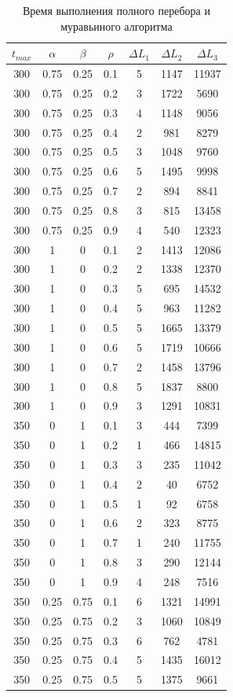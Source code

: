 \documentclass[a4paper,oneside,14pt]{extreport}
\begin{document}
\begin{table}[H]
\begin{center}
	\caption[]{\label{tbl:only} Время выполнения полного перебора и муравьиного алгоритма}
	\begin{tabular}{|c|c|c|c|c|c|c|}
		\hline
		$t_{max}$ & $\alpha$ & $\beta$ &$\rho$ & $\Delta L_{1}$ & $\Delta L_{2}$ & $\Delta L_{3}$\\
		\hline
		300 & 0.75 & 0.25 & 0.1 & 5 & 1147 & 11937 \\
		300 & 0.75 & 0.25 & 0.2 & 3 & 1722 & 5690 \\
		300 & 0.75 & 0.25 & 0.3 & 4 & 1148 & 9056 \\
		300 & 0.75 & 0.25 & 0.4 & 2 & 981 & 8279 \\
		300 & 0.75 & 0.25 & 0.5 & 3 & 1048 & 9760 \\
		300 & 0.75 & 0.25 & 0.6 & 5 & 1495 & 9998 \\
		300 & 0.75 & 0.25 & 0.7 & 2 & 894 & 8841 \\
		300 & 0.75 & 0.25 & 0.8 & 3 & 815 & 13458 \\
		300 & 0.75 & 0.25 & 0.9 & 4 & 540 & 12323 \\
		300 & 1 & 0 & 0.1 & 2 & 1413 & 12086 \\
		300 & 1 & 0 & 0.2 & 2 & 1338 & 12370 \\
		300 & 1 & 0 & 0.3 & 5 & 695 & 14532 \\
		300 & 1 & 0 & 0.4 & 5 & 963 & 11282 \\
		300 & 1 & 0 & 0.5 & 5 & 1665 & 13379 \\
		300 & 1 & 0 & 0.6 & 5 & 1719 & 10666 \\
		300 & 1 & 0 & 0.7 & 2 & 1458 & 13796 \\
		300 & 1 & 0 & 0.8 & 5 & 1837 & 8800 \\
		300 & 1 & 0 & 0.9 & 3 & 1291 & 10831 \\
		350 & 0 & 1 & 0.1 & 3 & 444 & 7399 \\
		350 & 0 & 1 & 0.2 & 1 & 466 & 14815 \\
		350 & 0 & 1 & 0.3 & 3 & 235 & 11042 \\
		350 & 0 & 1 & 0.4 & 2 & 40 & 6752 \\
		350 & 0 & 1 & 0.5 & 1 & 92 & 6758 \\
		350 & 0 & 1 & 0.6 & 2 & 323 & 8775 \\
		350 & 0 & 1 & 0.7 & 1 & 240 & 11755 \\
		350 & 0 & 1 & 0.8 & 3 & 290 & 12144 \\
		350 & 0 & 1 & 0.9 & 4 & 248 & 7516 \\
		350 & 0.25 & 0.75 & 0.1 & 6 & 1321 & 14991 \\
		350 & 0.25 & 0.75 & 0.2 & 3 & 1060 & 10849 \\
		350 & 0.25 & 0.75 & 0.3 & 6 & 762 & 4781 \\
		350 & 0.25 & 0.75 & 0.4 & 5 & 1435 & 16012 \\
		350 & 0.25 & 0.75 & 0.5 & 5 & 1375 & 9661 \\
		
		\hline
	\end{tabular}
\end{center}
\end{table}
\end{document}
